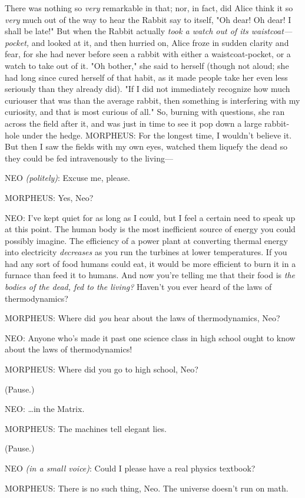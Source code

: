 There was nothing so \emph{very} remarkable in that; nor, in fact, did Alice 
think it so \emph{very} much out of the way to hear the Rabbit say to itself, 
"Oh dear! Oh dear! I shall be late!" But when the Rabbit actually \emph{took a 
watch out of its waistcoat---pocket,} and looked at it, and then hurried on, 
Alice froze in sudden clarity and fear, for she had never before seen a rabbit 
with either a waistcoat-pocket, or a watch to take out of it. "Oh bother," she 
said to herself (though not aloud; she had long since cured herself of that 
habit, as it made people take her even less seriously than they already did). 
"If I did not immediately recognize how much curiouser that was than the 
average rabbit, then something is interfering with my curiosity, and that is 
most curious of all." So, burning with questions, she ran across the field 
after it, and was just in time to see it pop down a large rabbit-hole under the 
hedge.
\sbreak
MORPHEUS: For the longest time, I wouldn't believe it. But then I saw the 
fields with my own eyes, watched them liquefy the dead so they could be fed 
intravenously to the living---

NEO \emph{(politely)}: Excuse me, please.

MORPHEUS: Yes, Neo?

NEO: I've kept quiet for as long as I could, but I feel a certain need to speak 
up at this point. The human body is the most inefficient source of energy you 
could possibly imagine. The efficiency of a power plant at converting thermal 
energy into electricity \emph{decreases} as you run the turbines at lower 
temperatures. If you had any sort of food humans could eat, it would be more 
efficient to burn it in a furnace than feed it to humans. And now you're 
telling me that their food is \emph{the bodies of the dead, fed to the living?} 
Haven't you ever heard of the laws of thermodynamics?

MORPHEUS: Where did \emph{you} hear about the laws of thermodynamics, Neo?

NEO: Anyone who's made it past one science class in high school ought to know 
about the laws of thermodynamics!

MORPHEUS: Where did you go to high school, Neo?

(Pause.)

NEO: {\ldots}in the Matrix.

MORPHEUS: The machines tell elegant lies.

(Pause.)

NEO \emph{(in a small voice)}: Could I please have a real physics textbook?

MORPHEUS: There is no such thing, Neo. The universe doesn't run on math.
